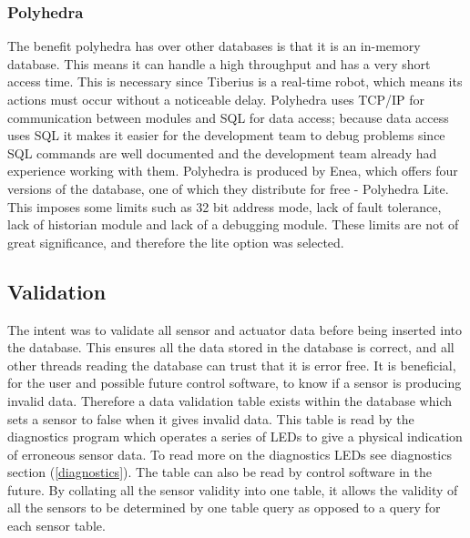 \subsubsection{Polyhedra}
The benefit polyhedra has over other databases is that it is an in-memory database. This means it can handle a high throughput and has a very short access time. This is necessary since Tiberius is a real-time robot, which means its actions must occur without a noticeable delay. 
\newline
Polyhedra uses TCP/IP for communication between modules and SQL for data access; because data access uses SQL it makes it easier for the development team to debug problems since SQL commands are well documented and the development team already had experience working with them.
\newline
Polyhedra is produced by Enea, which offers four versions of the database, one of which they distribute for free - Polyhedra Lite. This imposes some limits such as 32 bit address mode, lack of fault tolerance, lack of historian module and lack of a debugging module. These limits are not of great significance, and therefore the lite option was selected. 

\subsection{Validation}
The intent was to validate all sensor and actuator data before being inserted into the database. This ensures all the data stored in the database is correct, and all other threads reading the database can trust that it is error free. 
\newline
It is beneficial, for the user and possible future control software, to know if a sensor is producing invalid data. Therefore a data validation table exists within the database which sets a sensor to false when it gives invalid data. 
This table is read by the diagnostics program which operates a series of LEDs to give a physical indication of erroneous sensor data. To read more on the diagnostics LEDs see diagnostics section (\ref{diagnostics}).
The table can also be read by control software in the future. By collating all the sensor validity into one table, it allows the validity of all the sensors to be determined by one table query as opposed to a query for each sensor table.

